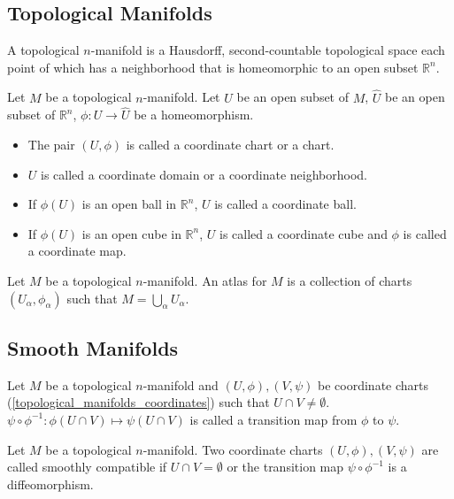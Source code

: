 \subsection{Topological Manifolds}

\begin{defn}
  A topological $n$-manifold is a Hausdorff, second-countable topological space each point of which has a neighborhood that is homeomorphic to an open subset $\mathbb{R}^n$.
\end{defn}

\begin{defn}[Coordinates]\label{topological_manifolds_coordinates}
  Let $M$ be a topological $n$-manifold.
  Let $U$ be an open subset of $M$, $\hat{U}$ be an open subset of $\mathbb{R}^n$, $\phi: U \rightarrow \hat{U}$ be a homeomorphism.
  \begin{itemize}
    \item
      The pair $(U, \phi)$ is called a coordinate chart or a chart.
    \item
      $U$ is called a coordinate domain or a coordinate neighborhood.
    \item
      If $\phi(U)$ is an open ball in $\mathbb{R}^n$, $U$ is called a coordinate ball.
    \item
      If $\phi(U)$ is an open cube in $\mathbb{R}^n$, $U$ is called a coordinate cube and $\phi$ is called a coordinate map.
  \end{itemize}
\end{defn}

\begin{defn}[Atlas]
  Let $M$ be a topological $n$-manifold.
  An atlas for $M$ is a collection of charts $(U_{\alpha}, \phi_{\alpha})$ such that $M = \bigcup_{\alpha} U_{\alpha}$.
\end{defn}

\subsection{Smooth Manifolds}

\begin{defn}
  Let $M$ be a topological $n$-manifold and $(U, \phi), (V, \psi)$ be coordinate charts (\ref{topological_manifolds_coordinates}) such that $U \cap V \ne \emptyset$.
  $\psi \circ \phi^{-1}: \phi(U \cap V) \mapsto \psi(U \cap V)$ is called a transition map from $\phi$ to $\psi$.
\end{defn}

\begin{defn}
  Let $M$ be a topological $n$-manifold.
  Two coordinate charts $(U, \phi), (V, \psi)$ are called smoothly compatible if $U \cap V = \emptyset$ or the transition map $\psi \circ \phi^{-1}$ is a diffeomorphism.
\end{defn}
